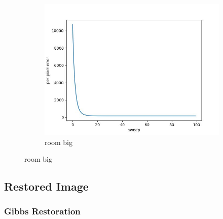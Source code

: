 \documentclass[11pt]{article}
\begin{document}
\begin{figure}[ht!]
\begin{subfigure}[]{0.333\linewidth}
        \includegraphics[width=\linewidth]{fig/loss/room_big_loss.jpg}
        \caption{room big}
    \end{subfigure}%
\end{figure}

\subsection{Restored Image}

\subsubsection{Gibbs Restoration}
\end{document}
